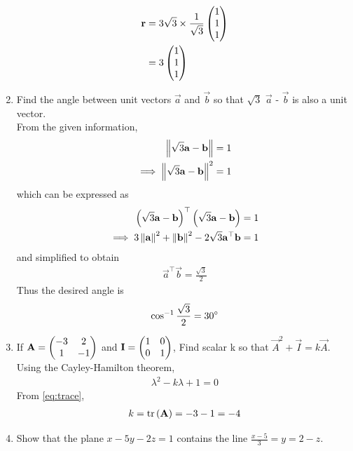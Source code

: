 \documentclass[journal,12pt,twocolumn]{IEEEtran}
\renewcommand\thesection{\arabic{section}}
\begin{document}
\begin{enumerate}[label=\thesection.\arabic*.,ref=\thesection.\theenumi]
  \begin{align}
	  \mathbf{r} &=  3\sqrt{3}\times \frac{1}{\sqrt{3}}\begin{pmatrix}1\\1\\1\end{pmatrix}
	  \\
		  &=3\begin{pmatrix}1\\1\\1\end{pmatrix}
	  \label{eq:equal_incline_unit_ans}
  \end{align}
%    
\item    Find the angle between unit vectors $\vec{a}$ and $\vec{b}$ so that $\sqrt{3}$ $\vec{a}$ - $\vec{b}$ is also a unit vector.
	\\
	\solution From the given information, 
  \begin{align}
	  \left\lVert	\sqrt{3}\mathbf{a} - \mathbf{b}\right\rVert &= 1
	  \\
	  \implies \left\lVert	\sqrt{3}\mathbf{a} - \mathbf{b}\right\rVert^2 &= 1
	  \label{eq:norm_unit}
  \end{align}
  which can be expressed as 
  \begin{align}
	  \left(	\sqrt{3}\mathbf{a} - \mathbf{b}\right)^{\top} \left(	\sqrt{3}\mathbf{a} - \mathbf{b}\right)&= 1
	  \\
	  \implies  3 \left\lVert\mathbf{a}\right\rVert^2  + \left\lVert\mathbf{b}\right\rVert^2 - 2 \sqrt{3} \mathbf{a}^{\top}\mathbf{b} &= 1
	  \label{eq:norm_unit_mid}
  \end{align}
  and simplified to obtain 
  \begin{align}
	\vec{a}^{\top}\vec{b}  =  \frac{\sqrt{3}}{2} 
	  \label{eq:norm_unit_mid_angle}
  \end{align}
  Thus the desired angle  is 
  \begin{align}
\cos^{-1}   \frac{\sqrt{3}}{2} = 30 \degree
	  \label{eq:norm_unit_mid_angle_ans}
  \end{align}
\item If $\mathbf{A}=\begin{pmatrix}-3 & 2 \\ 1 & -1 \end{pmatrix} $ and $ \mathbf{I}=\begin{pmatrix}1 & 0 \\ 0 & 1 \end{pmatrix}$, Find scalar k so that $\vec{A}^2 + \vec{I} = k\vec{A}$.
	\\
	\solution Using the Cayley-Hamilton theorem, 
  \begin{align}
	  \lambda^2 - k \lambda + 1 = 0
	  \label{eq:cayley_applic}
  \end{align}
From 	\eqref{eq:trace}, 
  \begin{align}
	   k  = \text{tr}\left(\mathbf{A}\right) = -3-1 = -4
	  \label{eq:cayley_sol}
  \end{align}
\item Show that the plane $x-5y-2z=1$ contains the line $\frac{x-5}{3}=y=2-z$. 

\end{enumerate}
\end{document}
